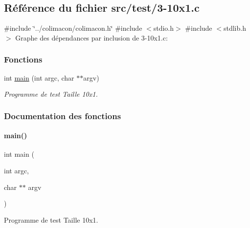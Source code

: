 \hypertarget{3-10x1_8c}{}\subsection{Référence du fichier src/test/3-\/10x1.c}
\label{3-10x1_8c}
{\ttfamily \#include \char`\"{}../colimacon/colimacon.\+h\char`\"{}}\newline
{\ttfamily \#include $<$stdio.\+h$>$}\newline
{\ttfamily \#include $<$stdlib.\+h$>$}\newline
Graphe des dépendances par inclusion de 3-\/10x1.c\+:
\subsubsection*{Fonctions}
\begin{DoxyCompactItemize}
\item 
int \hyperlink{3-10x1_8c_a3c04138a5bfe5d72780bb7e82a18e627}{main} (int argc, char $\ast$$\ast$argv)
\begin{DoxyCompactList}\small\item\em Programme de test Taille 10x1. \end{DoxyCompactList}\end{DoxyCompactItemize}


\subsubsection{Documentation des fonctions}
\mbox{\label{3-10x1_8c_a3c04138a5bfe5d72780bb7e82a18e627}} 
\paragraph{\texorpdfstring{main()}{main()}}
{\footnotesize\ttfamily int main (\begin{DoxyParamCaption}\item[{int}]{argc,  }\item[{char $\ast$$\ast$}]{argv }\end{DoxyParamCaption})}



Programme de test Taille 10x1. 

